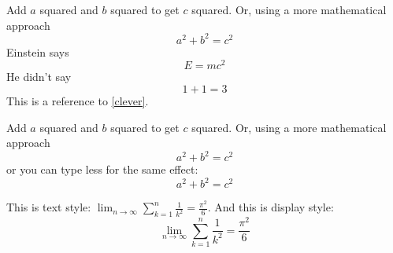 \documentclass{article}
\begin{document}
Add $a$ squared and $b$ squared
to get $c$ squared. Or, using
a more mathematical approach
\begin{equation}
    a^2 + b^2 = c^2
\end{equation}
Einstein says
\begin{equation}
    E = mc^2 \label{clever}
\end{equation}
He didn't say
\begin{equation}
    1 + 1 = 3 \tag{dumb}
\end{equation}
This is a reference to \eqref{clever}.


Add $a$ squared and $b$ squared
to get $c$ squared. Or, using
a more mathematical approach
 \begin{equation*}
   a^2 + b^2 = c^2
 \end{equation*}
or you can type less for the
same effect:
 \[ a^2 + b^2 = c^2 \]

 This is text style:
$\lim_{n \to \infty}
 \sum_{k=1}^n \frac{1}{k^2}
 = \frac{\pi^2}{6}$.
And this is display style:
 \begin{equation}
  \lim_{n \to \infty}
  \sum_{k=1}^n \frac{1}{k^2}
  = \frac{\pi^2}{6}
 \end{equation}
\end{document}
